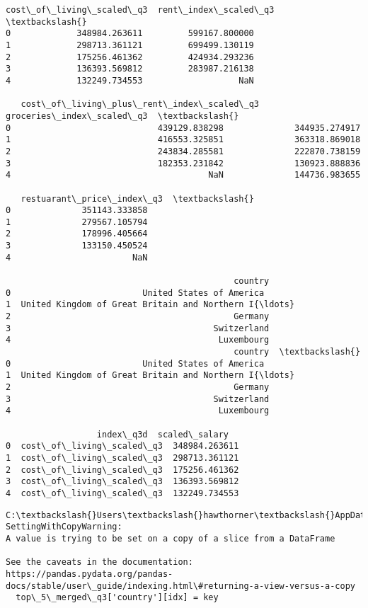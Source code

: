 \documentclass[11pt]{article}
\begin{document}
    \begin{Verbatim}[commandchars=\\\{\}]
   cost\_of\_living\_scaled\_q3  rent\_index\_scaled\_q3  \textbackslash{}
0             348984.263611         599167.800000
1             298713.361121         699499.130119
2             175256.461362         424934.293236
3             136393.569812         283987.216138
4             132249.734553                   NaN

   cost\_of\_living\_plus\_rent\_index\_scaled\_q3  groceries\_index\_scaled\_q3  \textbackslash{}
0                             439129.838298              344935.274917
1                             416553.325851              363318.869018
2                             243834.285581              222870.738159
3                             182353.231842              130923.888836
4                                       NaN              144736.983655

   restuarant\_price\_index\_q3  \textbackslash{}
0              351143.333858
1              279567.105794
2              178996.405664
3              133150.450524
4                        NaN

                                             country
0                          United States of America
1  United Kingdom of Great Britain and Northern I{\ldots}
2                                            Germany
3                                        Switzerland
4                                         Luxembourg
                                             country  \textbackslash{}
0                          United States of America
1  United Kingdom of Great Britain and Northern I{\ldots}
2                                            Germany
3                                        Switzerland
4                                         Luxembourg

                  index\_q3d  scaled\_salary
0  cost\_of\_living\_scaled\_q3  348984.263611
1  cost\_of\_living\_scaled\_q3  298713.361121
2  cost\_of\_living\_scaled\_q3  175256.461362
3  cost\_of\_living\_scaled\_q3  136393.569812
4  cost\_of\_living\_scaled\_q3  132249.734553
    \end{Verbatim}

    \begin{Verbatim}[commandchars=\\\{\}]
C:\textbackslash{}Users\textbackslash{}hawthorner\textbackslash{}AppData\textbackslash{}Local\textbackslash{}Temp\textbackslash{}ipykernel\_22188\textbackslash{}2430392722.py:33:
SettingWithCopyWarning:
A value is trying to be set on a copy of a slice from a DataFrame

See the caveats in the documentation: https://pandas.pydata.org/pandas-
docs/stable/user\_guide/indexing.html\#returning-a-view-versus-a-copy
  top\_5\_merged\_q3['country'][idx] = key
    \end{Verbatim}
\end{document}
